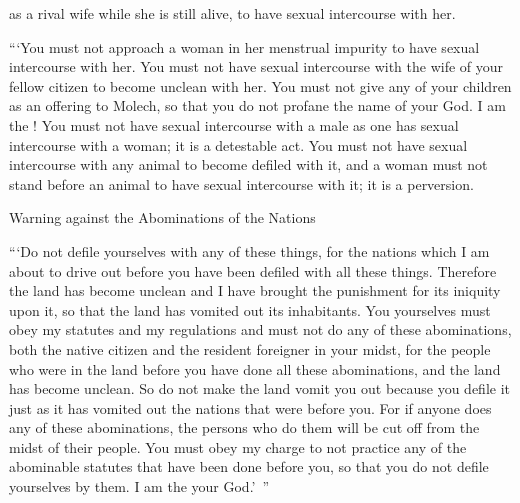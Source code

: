 {as a rival
wife while she is still alive,
to have sexual intercourse with her.
\par }{\PP {}“‘You must not
approach
a woman
in her menstrual
impurity
to have sexual intercourse with her.
You must not
have sexual
intercourse
with the wife
of your fellow citizen
to become unclean with her.
You must not
give
any of your children
as an offering to Molech,
so that you do not
profane
the
name
of your God.
I am
the {}!
You must not
have sexual intercourse
with
a male
as one has sexual intercourse
with a woman;
it is
a detestable act.
You must not
have sexual
intercourse
with any
animal
to become defiled
with it, and a woman
must not
stand
before
an animal
to have sexual
intercourse with it; it is
a perversion.
\par }{\SH Warning against the Abominations of the Nations
\par }{\PP {}“‘Do not
defile
yourselves with any
of these
things, for
the nations
which
I am
about to drive
out before
you have been defiled
with all
these things.
Therefore the land
has become unclean
and I have brought the punishment
for its iniquity
upon
it, so that the land
has vomited
out its inhabitants.
You yourselves
must obey
my statutes
and my regulations
and must not
do
any
of these
abominations,
both the native citizen
and the resident
foreigner
in your midst,
for
the people
who were in the land
before
you have done
all
these
abominations,
and the land
has become unclean.
So do not
make the land
vomit
you out because you defile
it just
as it has vomited
out the nations
that
were before you.
For if
anyone
does
any
of these
abominations,
the persons
who do
them will be cut off
from the midst
of their people.
You must obey
my charge
to not
practice
any of the abominable
statutes
that have been
done
before
you, so that you do not
defile
yourselves by them. I am
the {}
your God.’ ”

}
